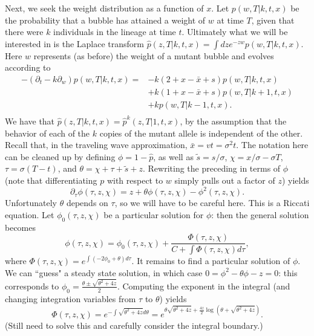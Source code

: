 \documentclass[rmp]{revtex4}
\begin{document}
Next, we seek the weight distribution as a function of $x$.
Let $p(w,T|k,t,x)$ be the probability that a bubble has attained a weight of $w$ at time $T$, given that there were $k$ individuals in the lineage at time $t$.
Ultimately what we will be interested in is the Laplace transform $\hat{p} (z,T|k,t,x) = \int dz e^{-zw} p(w,T|k,t,x)$.
Here $w$ represents (as before) the weight of a mutant bubble and evolves according to
\begin{align*}
-(\partial_t -k\partial_w) p(w,T|k,t,x) = &-k(2+x-\bar{x}+s)p(w,T|k,t,x) \\
& + k(1+x-\bar{x}+s)p(w,T|k+1,t,x) \\
& +kp(w,T|k-1,t,x). \\
\end{align*}
We have that $\hat{p} (z,T|k,t,x) = \hat{p}^k (z,T|1,t,x)$, by the assumption that the behavior of each of the $k$ copies of the mutant allele is independent of the other.
Recall that, in the traveling wave approximation, $\bar{x} = vt = \sigma^2 t$.
The notation here can be cleaned up by defining $\phi = 1 - \hat{p}$, as well as $\tilde{s} = s/\sigma$, $\chi = x/\sigma - \sigma T$, $\tau = \sigma(T-t)$, and $\theta = \chi+\tau+\tilde{s}+z$.
Rewriting the preceding in terms of $\phi$ (note that differentiating $p$ with respect to $w$ simply pulls out a factor of $z$) yields
\begin{equation}
\partial_\tau \phi(\tau,z,\chi) = z + \theta \phi(\tau,z,\chi) - \phi^2(\tau,z,\chi).
\end{equation}
Unfortunately $\theta$ depends on $\tau$, so we will have to be careful here.
This is a Riccati equation.
Let $\phi_0(\tau,z,\chi)$ be a particular solution for $\phi$: then the general solution becomes
\begin{equation}
\phi(\tau,z,\chi) = \phi_0(\tau,z,\chi) + \frac{\Phi(\tau,z,\chi)}{C + \int \Phi(\tau,z,\chi) d\tau},
\end{equation}
where $\Phi(\tau,z,\chi) = e^{\int (-2\phi_0 + \theta ) d\tau}$.
It remains to find a particular solution of $\phi$.
We can ``guess" a steady state solution, in which case $0 = \phi^2 - \theta \phi - z = 0$: this corresponds to $\phi_0 = \frac{\theta \pm \sqrt{\theta^2 + 4z}}{2}$.
Computing the exponent in the integral (and changing integration variables from $\tau$ to $\theta$) yields
\begin{equation}
\Phi (\tau, z, \chi) = e^{-\int \sqrt{\theta^2 + 4z} d\theta} = e^{\theta\sqrt{\theta^2+4z} + \frac{4z}{2}\log (\theta + \sqrt{\theta^2 + 4z})}.
\end{equation}
(Still need to solve this and carefully consider the integral boundary.)
\end{document}
